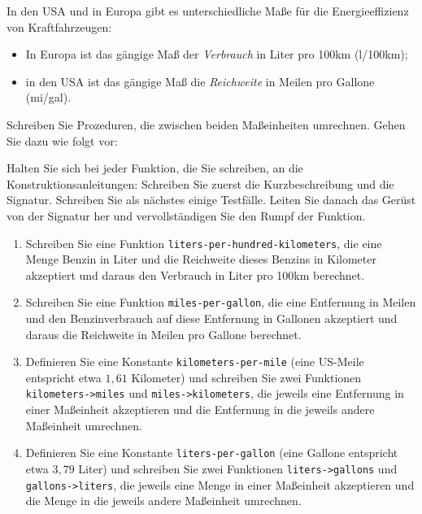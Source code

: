\begin{aufgabe}

  In den USA und in Europa gibt es unterschiedliche
  Maße für die Energieeffizienz von Kraftfahrzeugen:
  \begin{itemize}
  \item In Europa ist das gängige Maß der \emph{Verbrauch} in Liter
    pro 100km (l/100km);
  \item in den USA ist das gängige Maß die \emph{Reichweite} in Meilen
    pro Gallone (mi/gal).
  \end{itemize}
  Schreiben Sie Prozeduren, die zwischen beiden Maßeinheiten
  umrechnen.  Gehen Sie dazu wie folgt vor:

  Halten Sie sich bei jeder Funktion, die Sie schreiben, an die
  Konstruktionsanleitungen: Schreiben Sie zuerst die Kurzbeschreibung
  und die Signatur.  Schreiben Sie als nächstes einige Testfälle.
  Leiten Sie danach das Gerüst von der Signatur her und vervollständigen
  Sie den Rumpf der Funktion.

  \begin{enumerate}

  \item Schreiben Sie eine Funktion
    \texttt{liters-per-hundred-kilometers}, die eine Menge Benzin in
    Liter und die Reichweite dieses Benzins in Kilometer akzeptiert
    und daraus den Verbrauch in Liter pro 100km berechnet.

  \item Schreiben Sie eine Funktion
    \texttt{miles-per-gallon}, die eine Entfernung in Meilen und den
    Benzinverbrauch auf diese Entfernung in Gallonen akzeptiert und
    daraus die Reichweite in Meilen pro Gallone berechnet.

  \item Definieren Sie eine Konstante
    \texttt{kilometers-per-mile} (eine US-Meile entspricht etwa $1,61$
    Kilometer) und schreiben Sie zwei Funktionen
    \texttt{kilometers->miles} und \texttt{miles->kilometers}, die
    jeweils eine Entfernung in einer Maßeinheit akzeptieren und die
    Entfernung in die jeweils andere Maßeinheit umrechnen.

  \item Definieren Sie eine Konstante
    \texttt{liters-per-gallon} (eine Gallone entspricht etwa $3,79$
    Liter) und schreiben Sie zwei Funktionen \texttt{liters->gallons}
    und \texttt{gallons->liters}, die jeweils eine Menge in einer
    Maßeinheit akzeptieren und die Menge in die jeweils andere
    Maßeinheit umrechnen.


\end{enumerate}
\end{aufgabe}
